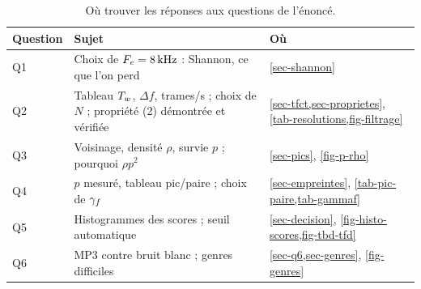 \begin{abstract}
\noindent Nous identifions un morceau à partir d'un extrait court, bruité et pris à un
instant inconnu, en suivant la méthode de Wang : constellation de maxima locaux du
spectrogramme, clés formées de paires de pics, index inversé et vote sur le décalage
temporel. Sur une base de 100 morceaux, avec 200 requêtes positives et 50 négatives de
test par condition, le système atteint un \TBD{} de \qty{92}{\percent} sans aucune fausse
détection ($\TFD = 0/50$, soit moins d'environ \qty{6}{\percent}) pour $\Tq = \qty{5}{\second}$,
$\sthr = 35$ et un bruit blanc à \qty{10}{\decibel} ; le MP3, même à
\qty{32}{\kilo\bit\per\second}, et le passe-bande téléphonique le gênent à peine, la
réverbération de \qty{1}{\second} le met en échec ($\TBD = \qty{51}{\percent}$). La théorie
explique pourquoi l'empreinte est invariante au gain et au filtrage, prévoit un score en
$F\rho\Tq p^2$ et fixe un plancher au seuil de décision ; elle prédit aussi qu'un extrait
plus long résiste mieux au bruit, ce que confirme la mesure (à \qty{0}{\decibel}, \TBD{} de
\qty{38.5}{\percent} à $\Tq = \qty{3}{\second}$ et de \qty{85.5}{\percent} à \qty{10}{\second}).
\end{abstract}

\begin{table}[h]
  \centering\small
  \caption{Où trouver les réponses aux questions de l'énoncé.}
  \label{tab-ou-reponses}
  \begin{tabularx}{\linewidth}{@{}lXl@{}}
    \toprule
    Question & Sujet & Où \\
    \midrule
    Q1 & Choix de $F_e = \qty{8}{\kilo\hertz}$ : Shannon, ce que l'on perd
       & \cref{sec-shannon} \\
    Q2 & Tableau $T_w$, $\Delta f$, trames/s ; choix de $N$ ; propriété (2) démontrée et vérifiée
       & \cref{sec-tfct,sec-proprietes}, \cref{tab-resolutions,fig-filtrage} \\
    Q3 & Voisinage, densité $\rho$, survie $p$ ; pourquoi $\rho p^2$
       & \cref{sec-pics}, \cref{fig-p-rho} \\
    Q4 & $p$ mesuré, tableau pic/paire ; choix de $\gamma_f$
       & \cref{sec-empreintes}, \cref{tab-pic-paire,tab-gammaf} \\
    Q5 & Histogrammes des scores ; seuil automatique
       & \cref{sec-decision}, \cref{fig-histo-scores,fig-tbd-tfd} \\
    Q6 & MP3 contre bruit blanc ; genres difficiles
       & \cref{sec-q6,sec-genres}, \cref{fig-genres} \\
    \bottomrule
  \end{tabularx}
\end{table}
